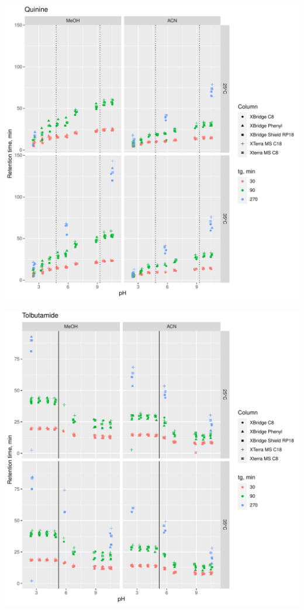 \documentclass[
]{article}
\begin{document}
\newpage{}

\includegraphics{../figures/rawdata/Quinine.pdf}

\newpage{}

\includegraphics{../figures/rawdata/Tolbutamide.pdf}
\end{document}
